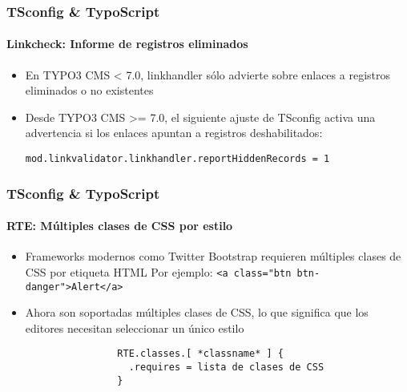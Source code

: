
\begin{frame}[fragile]
	\frametitle{TSconfig \& TypoScript}
	\framesubtitle{Linkcheck: Informe de registros eliminados}

	\begin{itemize}
		\item En TYPO3 CMS < 7.0, linkhandler sólo advierte sobre enlaces a registros eliminados o no existentes
		\item Desde TYPO3 CMS >=  7.0, el siguiente ajuste de TSconfig activa una advertencia si los enlaces apuntan a registros deshabilitados:

			\lstinline!mod.linkvalidator.linkhandler.reportHiddenRecords = 1!

	\end{itemize}

\end{frame}


\begin{frame}[fragile]
	\frametitle{TSconfig \& TypoScript}
	\framesubtitle{RTE: Múltiples clases de CSS por estilo}

	\begin{itemize}
		\item Frameworks modernos como Twitter Bootstrap requieren múltiples clases de CSS por etiqueta HTML\newline
			\small Por ejemplo: \texttt{<a class="btn btn-danger">Alert</a>}\normalsize
		\item Ahora son soportadas múltiples clases de CSS, lo que significa que los editores necesitan seleccionar un único estilo

			\begin{lstlisting}
				RTE.classes.[ *classname* ] {
				  .requires = lista de clases de CSS
				}
			\end{lstlisting}

	\end{itemize}

\end{frame}

